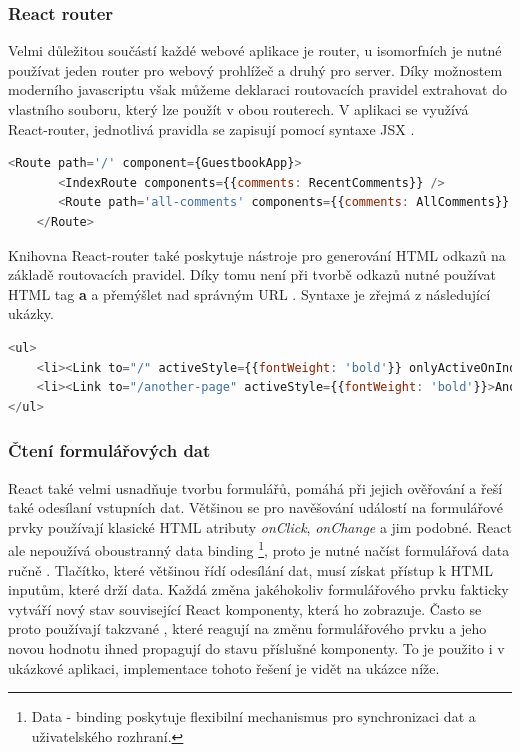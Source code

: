 \subsubsection{React router}
Velmi důležitou součástí každé webové aplikace je router, u isomorfních je nutné používat jeden router pro webový prohlížeč a druhý pro server. Díky možnostem moderního javascriptu však můžeme deklaraci routovacích pravidel extrahovat do vlastního souboru, který lze použít v obou routerech. V aplikaci se využívá React-router, jednotlivá pravidla se zapisují pomocí syntaxe JSX \cite{react_router}.
\begin{lstlisting}[language=Javascript,caption={Deklarace routovacích pravidel pomocí nástroje React-router}]
    <Route path='/' component={GuestbookApp}>
       <IndexRoute components={{comments: RecentComments}} />
       <Route path='all-comments' components={{comments: AllComments}} />
    </Route>
\end{lstlisting}

Knihovna React-router také poskytuje nástroje pro generování HTML odkazů na základě routovacích pravidel. Díky tomu není při tvorbě odkazů nutné používat HTML tag \textbf{a} a přemýšlet nad správným URL \cite{react_router}. Syntaxe je zřejmá z následující ukázky. 
\begin{lstlisting}[language=Javascript,caption={Využití generování HTML odkazů pomocí nástroje React-router}]
<ul>
	<li><Link to="/" activeStyle={{fontWeight: 'bold'}} onlyActiveOnIndex>Comments</Link></li>
	<li><Link to="/another-page" activeStyle={{fontWeight: 'bold'}}>Another Page</Link></li>
</ul>
\end{lstlisting}

\subsubsection{Čtení formulářových dat}
React také velmi usnadňuje tvorbu formulářů, pomáhá při jejich ověřování a řeší také odesílaní vstupních dat. Většinou se pro navěšování událostí na formulářové prvky používají klasické HTML atributy \textit{onClick}, \textit{onChange} a jim podobné. React ale nepoužívá oboustranný data binding \footnote{Data - binding poskytuje flexibilní mechanismus pro synchronizaci dat a uživatelského rozhraní.}, proto je nutné načíst formulářová data ručně \cite{react}. Tlačítko, které většinou řídí odesílání dat, musí získat přístup k HTML inputům, které drží data. Každá změna jakéhokoliv formulářového prvku fakticky vytváří nový stav související React komponenty, která ho zobrazuje. Často se proto používají takzvané , které reagují na změnu formulářového prvku a jeho novou hodnotu ihned propagují do stavu příslušné komponenty. To je použito i v ukázkové aplikaci, implementace tohoto řešení je vidět na ukázce níže.
 
